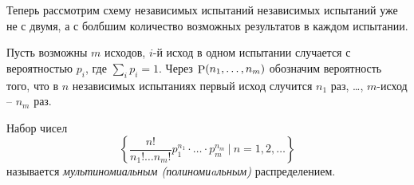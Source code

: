 Теперь рассмотрим схему независимых испытаний независимых испытаний уже не с двумя, а с болбшим количество возможных результатов в каждом испытании. 

Пусть возможны $m$ исходов, $i$-й исход в одном испытании случается с вероятностью $p_i$, где $\sum_i p_i = 1$. Через $\P(n_1, \ldots, n_m)$ обозначим вероятность того, что в $n$ независимых испытаниях первый исход случится $n_1$ раз, \ldots, $m$-исход -- $n_m$ раз.


\begin{to_def}[$\mathfrak D$]
    Набор чисел
    \begin{equation*}
         \left\{
         \frac{n!}{n_1! \ldots n_m!} p_1^{n_1} \cdot \ldots \cdot p_m^{n_m}
         \ \bigg| \ n = 1, 2,  \ldots\right\}
    \end{equation*} 
    называется \textit{мультиномиальным (полиномиaльным)} распределением.
\end{to_def}


